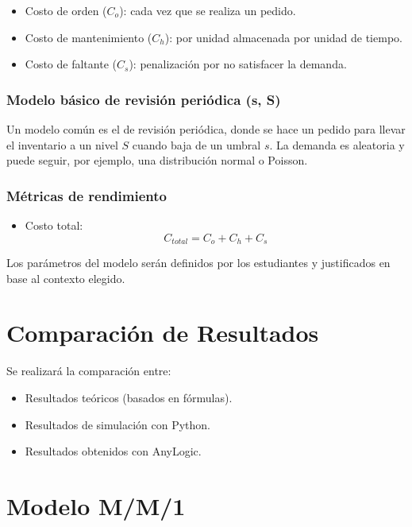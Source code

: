 \documentclass{article}
\begin{document}
\begin{itemize}
    \item Costo de orden (\( C_o \)): cada vez que se realiza un pedido.
    \item Costo de mantenimiento (\( C_h \)): por unidad almacenada por unidad de tiempo.
    \item Costo de faltante (\( C_s \)): penalización por no satisfacer la demanda.
\end{itemize}

\subsubsection*{Modelo básico de revisión periódica (s, S)}

Un modelo común es el de revisión periódica, donde se hace un pedido para llevar el inventario a un nivel \( S \) cuando baja de un umbral \( s \). La demanda es aleatoria y puede seguir, por ejemplo, una distribución normal o Poisson.

\subsubsection*{Métricas de rendimiento}

\begin{itemize}
    \item Costo total: 
    \[
        C_{total} = C_o + C_h + C_s
    \]
\end{itemize}

Los parámetros del modelo serán definidos por los estudiantes y justificados en base al contexto elegido.

\vspace{1em}

\section{Comparación de Resultados}
Se realizará la comparación entre:
\begin{itemize}
    \item Resultados teóricos (basados en fórmulas).
    \item Resultados de simulación con Python.
    \item Resultados obtenidos con AnyLogic.
\end{itemize}

\section{Modelo M/M/1}
\end{document}

